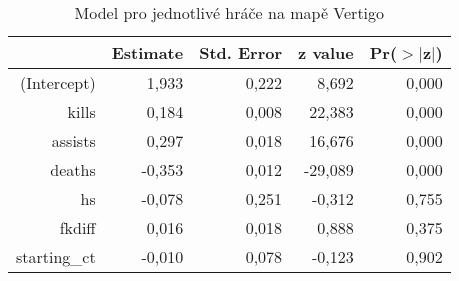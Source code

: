 \begin{table}[H]
\centering
\begin{tabular}{rrrrr}
  \hline
 & Estimate & Std. Error & z value & Pr($>$$|$z$|$) \\ 
  \hline
(Intercept) & 1,933 & 0,222 & 8,692 & 0,000 \\ 
  kills & 0,184 & 0,008 & 22,383 & 0,000 \\ 
  assists & 0,297 & 0,018 & 16,676 & 0,000 \\ 
  deaths & -0,353 & 0,012 & -29,089 & 0,000 \\ 
  hs & -0,078 & 0,251 & -0,312 & 0,755 \\ 
  fkdiff & 0,016 & 0,018 & 0,888 & 0,375 \\ 
  starting\_ct & -0,010 & 0,078 & -0,123 & 0,902 \\ 
   \hline
\end{tabular}
\caption{\label{tab:player_model_Vertigo}Model pro jednotlivé hráče na mapě Vertigo} 
\end{table}
